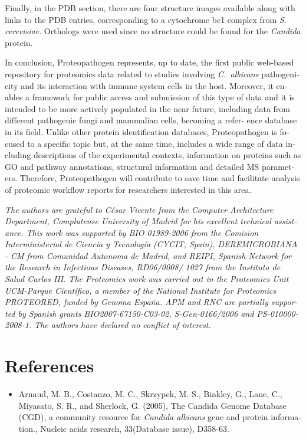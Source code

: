 \begin{otherlanguage}{british}
Finally, in the PDB section, there are four structure
images available along with links to the PDB entries,
corresponding to a cytochrome bc1 complex from \textit{S. cerevisiae}.
 Orthologs were used since no structure could be found
for the \textit{Candida} protein.

In conclusion, Proteopathogen represents, up to date, the
first public web-based repository for proteomics data related
to studies involving \textit{\mbox{C. albicans}} pathogenicity and its interaction
 with immune system cells in the host. Moreover, it
enables a framework for public access and submission of
this type of data and it is intended to be more actively
populated in the near future, including data from different
pathogenic fungi and mammalian cells, becoming a refer-
ence database in its field. Unlike other protein identification
databases, Proteopathogen is focused to a specific topic but,
at the same time, includes a wide range of data including
descriptions of the experimental contexts, information on
proteins such as GO and pathway annotations, structural
information and detailed MS parameters. Therefore,
Proteopathogen will contribute to save time and facilitate
analysis of proteomic workflow reports for researchers
interested in this area.

\medskip

\textit{
The authors are grateful to C\'esar Vicente from the Computer
Architecture Department, Complutense University of Madrid for
his excellent technical assistance. This work was supported by
BIO 01989-2006 from the Comision Interministerial de Ciencia
y Tecnolog\'ia (CYCIT, Spain), DEREMICROBIANA - CM
from Comunidad Autonoma de Madrid, and REIPI, Spanish
Network for the Research in Infectious Diseases, RD06/0008/
1027 from the Instituto de Salud Carlos III. The Proteomics
work was carried out in the Proteomics Unit UCM-Parque
Cient\'ifico, a member of the National Institute for Proteomics
PROTEORED, funded by Genoma Espa\~na. APM and RNC are
partially supported by Spanish grants BIO2007-67150-C03-02,
S-Gen-0166/2006 and PS-010000-2008-1.
The authors have declared no conflict of interest.
}


\section*{References}


\begin{itemize}[leftmargin=*]

\item[]{
Arnaud, M. B., Costanzo, M. C., Skrzypek, M. S., Binkley, G., Lane, C., Miyasato, S. R., and
Sherlock, G. (2005), The Candida Genome Database (CGD), a community resource for
\textit{Candida albicans} gene and protein information., Nucleic acids research, 33(Database issue), D358-63.
}


\end{itemize}
\end{otherlanguage}
